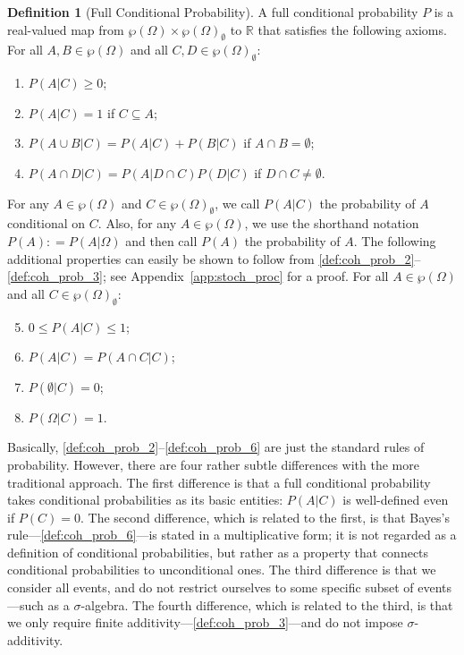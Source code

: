 \documentclass[10pt,a4paper]{paper}
\theoremstyle{definition}
\newtheorem{definition}{Definition}
\newcommand{\reals}{\mathbb{R}}
\newcommand{\paths}{\Omega}
\newcommand{\power}{\wp(\paths)}
\newcommand{\nonemptypower}{\power_{\emptyset}}
\newcommand{\coloneqq}{:\!=}
\begin{document}
\begin{definition}[Full Conditional Probability]\label{def:cond_prob}
A full conditional probability $P$ is a real-valued map from $\power\times\nonemptypower$ to $\reals$ that satisfies the following axioms. For all $A,B\in\power$ and all \mbox{$C,D\in\nonemptypower$}:
\vspace{5pt}

\begin{enumerate}[label=F\arabic*:,ref=F\arabic*]
\item
$P(A\vert C)\geq 0$;\label{def:coh_prob_2}
\item
$P(A\vert C)=1$ if $C\subseteq A$;\label{def:coh_prob_1}
\item
$P(A\cup B\vert C)=P(A\vert C)+P(B\vert C)$ if $A\cap B=\emptyset$;\label{def:coh_prob_3}
\item
$P(A\cap D\vert C)=P(A\vert D\cap C)P(D\vert C)$ if $D\cap C\neq\emptyset$.\label{def:coh_prob_6}
\end{enumerate}
\vspace{5pt}

\noindent
For any $A\in\power$ and $C\in\nonemptypower$, we call $P(A\vert C)$ the probability of $A$ conditional on $C$. Also, for any $A\in\power$, we use the shorthand notation $P(A)\coloneqq P(A\vert\paths)$ and then call $P(A)$ the probability of $A$.
The following additional properties can easily be shown to follow from \ref{def:coh_prob_2}--\ref{def:coh_prob_3}; see Appendix~\ref{app:stoch_proc} for a proof. For all $A\in\power$ and all $C\in\nonemptypower$:
\vspace{5pt}
\begin{enumerate}[label=F\arabic*:,ref=F\arabic*]
\setcounter{enumi}{4}
\item
$0\leq P(A\vert C)\leq 1$;\label{def:coh_prob_2b}
\item
$P(A\vert C)=P(A\cap C\vert C)$;\label{def:coh_prob_7}
\item
$P(\emptyset\vert C)=0$;\label{def:coh_prob_8}
\item
$P(\Omega\vert C)=1$.\label{def:coh_prob_5}
\end{enumerate}
\vspace{2pt}
\end{definition}

Basically, \ref{def:coh_prob_2}--\ref{def:coh_prob_6} are just the standard rules of probability. However, there are four rather subtle differences with the more traditional approach. The first difference is that a full conditional probability takes conditional probabilities as its basic entities: $P(A\vert C)$ is well-defined even if $P(C)=0$. The second difference, which is related to the first, is that Bayes's rule---\ref{def:coh_prob_6}---is stated in a multiplicative form; it is not regarded as a definition of conditional probabilities, but rather as a property that connects conditional probabilities to unconditional ones. The third difference is that we consider all events, and do not restrict ourselves to some specific subset of events---such as a $\sigma$-algebra. The fourth difference, which is related to the third, is that we only require finite additivity---\ref{def:coh_prob_3}---and do not impose $\sigma$-additivity.
\end{document}
